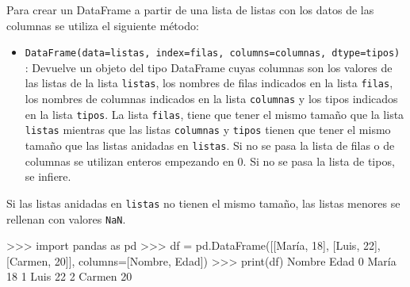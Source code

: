 \documentclass[
  spanish,
  a4paper,
]{scrreport}
\newenvironment{Shaded}{\begin{snugshade}}{\end{snugshade}}
\newcommand{\BuiltInTok}[1]{\textcolor[rgb]{0.00,0.23,0.31}{#1}}
\newcommand{\DecValTok}[1]{\textcolor[rgb]{0.68,0.00,0.00}{#1}}
\newcommand{\ImportTok}[1]{\textcolor[rgb]{0.00,0.46,0.62}{#1}}
\newcommand{\NormalTok}[1]{\textcolor[rgb]{0.00,0.23,0.31}{#1}}
\newcommand{\OperatorTok}[1]{\textcolor[rgb]{0.37,0.37,0.37}{#1}}
\newcommand{\StringTok}[1]{\textcolor[rgb]{0.13,0.47,0.30}{#1}}
\providecommand{\tightlist}{%
  \setlength{\itemsep}{0pt}\setlength{\parskip}{0pt}}
\begin{document}
Para crear un DataFrame a partir de una lista de listas con los datos de
las columnas se utiliza el siguiente método:

\begin{itemize}
\tightlist
\item
  \texttt{DataFrame(data=listas,\ index=filas,\ columns=columnas,\ dtype=tipos)}
  : Devuelve un objeto del tipo DataFrame cuyas columnas son los valores
  de las listas de la lista \texttt{listas}, los nombres de filas
  indicados en la lista \texttt{filas}, los nombres de columnas
  indicados en la lista \texttt{columnas} y los tipos indicados en la
  lista \texttt{tipos}. La lista \texttt{filas}, tiene que tener el
  mismo tamaño que la lista \texttt{listas} mientras que las listas
  \texttt{columnas} y \texttt{tipos} tienen que tener el mismo tamaño
  que las listas anidadas en \texttt{listas}. Si no se pasa la lista de
  filas o de columnas se utilizan enteros empezando en 0. Si no se pasa
  la lista de tipos, se infiere.
\end{itemize}

\begin{tcolorbox}[enhanced jigsaw, arc=.35mm, bottomrule=.15mm, bottomtitle=1mm, breakable, colback=white, colbacktitle=quarto-callout-warning-color!10!white, colframe=quarto-callout-warning-color-frame, coltitle=black, left=2mm, leftrule=.75mm, opacityback=0, opacitybacktitle=0.6, rightrule=.15mm, title=\textcolor{quarto-callout-warning-color}{\faExclamationTriangle}\hspace{0.5em}{Advertencia}, titlerule=0mm, toprule=.15mm, toptitle=1mm]

Si las listas anidadas en \texttt{listas} no tienen el mismo tamaño, las
listas menores se rellenan con valores \texttt{NaN}.

\end{tcolorbox}

\begin{Shaded}
\begin{Highlighting}[]
\OperatorTok{\textgreater{}\textgreater{}\textgreater{}} \ImportTok{import}\NormalTok{ pandas }\ImportTok{as}\NormalTok{ pd}
\OperatorTok{\textgreater{}\textgreater{}\textgreater{}}\NormalTok{ df }\OperatorTok{=}\NormalTok{ pd.DataFrame([[}\StringTok{\textquotesingle{}María\textquotesingle{}}\NormalTok{, }\DecValTok{18}\NormalTok{], [}\StringTok{\textquotesingle{}Luis\textquotesingle{}}\NormalTok{, }\DecValTok{22}\NormalTok{], [}\StringTok{\textquotesingle{}Carmen\textquotesingle{}}\NormalTok{, }\DecValTok{20}\NormalTok{]], columns}\OperatorTok{=}\NormalTok{[}\StringTok{\textquotesingle{}Nombre\textquotesingle{}}\NormalTok{, }\StringTok{\textquotesingle{}Edad\textquotesingle{}}\NormalTok{])}
\OperatorTok{\textgreater{}\textgreater{}\textgreater{}} \BuiltInTok{print}\NormalTok{(df)}
\NormalTok{   Nombre   Edad}
\DecValTok{0}\NormalTok{   María     }\DecValTok{18}
\DecValTok{1}\NormalTok{    Luis     }\DecValTok{22}
\DecValTok{2}\NormalTok{  Carmen     }\DecValTok{20}
\end{Highlighting}
\end{Shaded}
\end{document}
